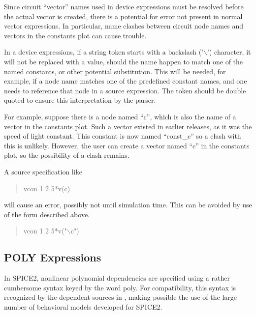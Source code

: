 Since circuit ``vector'' names used in device expressions must be
resolved before the actual vector is created, there is a potential for
error not present in normal vector expressions.  In particular, name
clashes between circuit node names and vectors in the {\vt constants}
plot can cause trouble.

In a device expressions, if a string token starts with a backslash
('$\backslash$') character, it will not be replaced with a value,
should the name happen to match one of the named constants, or other
potential substitution.  This will be needed, for example, if a node
name matches one of the predefined constant names, and one needs to
reference that node in a source expression.  The token should be
double quoted to ensure this interpretation by the parser.

For example, suppose there is a node named ``{\vt c}'', which is also
the name of a vector in the {\vt constants} plot.  Such a vector
existed in earlier {\WRspice} releases, as it was the speed of
light constant.  This constant is now named ``{\vt const\_c}'' so a
clash with this is unlikely.  However, the user can create a vector
named ``{\vt c}'' in the {\vt constants} plot, so the possibility of a
clash remains.

A source specification like
\begin{quote}\vt
vcon 1 2 5*v(c)
\end{quote}
will cause an error, possibly not until simulation time.  This
can be avoided by use of the form described above.
\begin{quote}\vt
vcon 1 2 5*v("$\backslash$c")
\end{quote}

\subsection{POLY Expressions}
\label{polyspec}


In SPICE2, nonlinear polynomial dependencies are specified using a
rather cumbersome syntax keyed by the word {\vt poly}.  For
compatibility, this syntax is recognized by the dependent sources in
{\WRspice}, making possible the use of the large number of behavioral
models developed for SPICE2.

